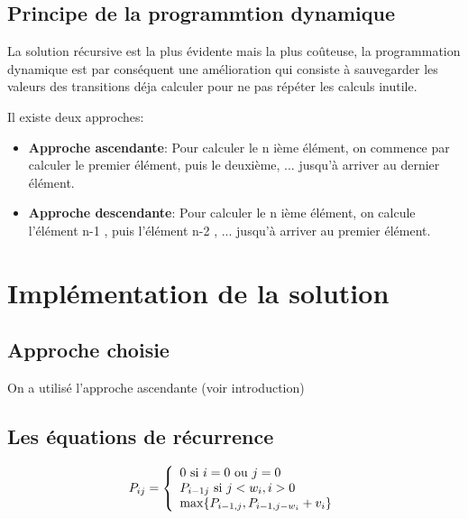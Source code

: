 \documentclass[12pt]{report}
\begin{document}
	\section{Principe de la programmtion dynamique}
	La solution récursive est la plus évidente mais la plus coûteuse, la programmation dynamique est par conséquent une amélioration qui consiste à sauvegarder les valeurs des transitions déja calculer pour ne pas répéter les calculs inutile.
	\par{}
	Il existe deux approches:
	\begin{itemize}
		\item \textbf {Approche ascendante}:
		Pour calculer le n ième élément, on commence par calculer le premier élément, puis le deuxième, ... jusqu'à arriver au dernier élément.
		\item \textbf {Approche descendante}:
		Pour calculer le n ième élément, on calcule l'élément n-1 , puis l'élément n-2 , ... jusqu'à arriver au premier élément.
		
	\end{itemize}	
	
	\chapter{Implémentation de la solution}
	\section{Approche choisie}
	On a utilisé l'approche ascendante (voir introduction)
	\section{Les équations de récurrence}
	\[
    P_{ij}=\left\{
                \begin{array}{ll}
                  0 $ si $ i=0$ ou $j=0\\
                  P_{i-1j} $ si $ j<w_{i} , i>0\\
                  \max\lbrace P_{i-1,j}, P_{i-1,j-w_{i}}+v_{i} \rbrace
                \end{array}
              \right.
  \]
\end{document}
